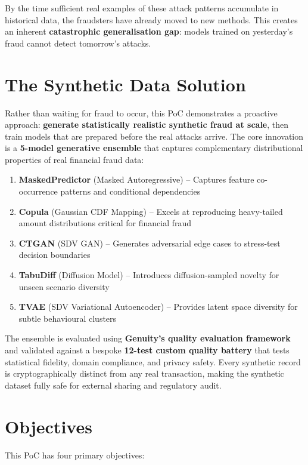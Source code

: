 \documentclass[12pt,a4paper,oneside]{book}
\begin{document}
By the time sufficient real examples of these attack patterns accumulate in historical data, the fraudsters have already moved to new methods. This creates an inherent \textbf{catastrophic generalisation gap}: models trained on yesterday's fraud cannot detect tomorrow's attacks.

\section{The Synthetic Data Solution}

Rather than waiting for fraud to occur, this PoC demonstrates a proactive approach: \textbf{generate statistically realistic synthetic fraud at scale}, then train models that are prepared before the real attacks arrive. The core innovation is a \textbf{5-model generative ensemble} that captures complementary distributional properties of real financial fraud data:

\begin{enumerate}
    \item \textbf{MaskedPredictor} (Masked Autoregressive) -- Captures feature co-occurrence patterns and conditional dependencies
    \item \textbf{Copula} (Gaussian CDF Mapping) -- Excels at reproducing heavy-tailed amount distributions critical for financial fraud
    \item \textbf{CTGAN} (SDV GAN) -- Generates adversarial edge cases to stress-test decision boundaries
    \item \textbf{TabuDiff} (Diffusion Model) -- Introduces diffusion-sampled novelty for unseen scenario diversity
    \item \textbf{TVAE} (SDV Variational Autoencoder) -- Provides latent space diversity for subtle behavioural clusters
\end{enumerate}

The ensemble is evaluated using \textbf{Genuity's quality evaluation framework} and validated against a bespoke \textbf{12-test custom quality battery} that tests statistical fidelity, domain compliance, and privacy safety. Every synthetic record is cryptographically distinct from any real transaction, making the synthetic dataset fully safe for external sharing and regulatory audit.

\section{Objectives}

This PoC has four primary objectives:
\end{document}
